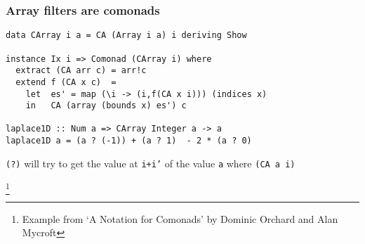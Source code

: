 \documentclass{beamer} %
\newcommand\blfootnote[1]{%
  \begingroup
  \renewcommand\thefootnote{}\footnote{#1}%
  \addtocounter{footnote}{-1}%
  \endgroup
}
\begin{document}
\begin{frame}[fragile]\frametitle{Array filters are comonads}

\begin{verbatim}
data CArray i a = CA (Array i a) i deriving Show

instance Ix i => Comonad (CArray i) where
  extract (CA arr c) = arr!c
  extend f (CA x c)  =
    let  es' = map (\i -> (i,f(CA x i))) (indices x)
    in   CA (array (bounds x) es') c

laplace1D :: Num a => CArray Integer a -> a
laplace1D a = (a ? (-1)) + (a ? 1)  - 2 * (a ? 0)
\end{verbatim}
\texttt{(?)} will try to get the value at \texttt{i+i'} of the value \texttt{a} 
where \texttt{(CA a i)} 

\blfootnote{Example from `A Notation for Comonads' by Dominic Orchard and Alan Mycroft}
\end{frame}
\end{document}
